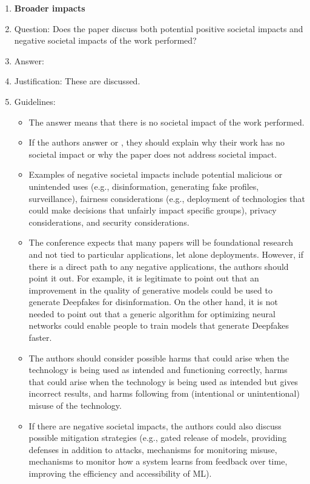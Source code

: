 \documentclass{article}
\theoremstyle{plain}
\theoremstyle{definition}
\theoremstyle{remark}
\begin{document}
\begin{enumerate}
\item {\bf Broader impacts}
    \item[] Question: Does the paper discuss both potential positive societal impacts and negative societal impacts of the work performed?
    \item[] Answer: \answerYes{} %
    \item[] Justification: These are discussed.
    \item[] Guidelines:
    \begin{itemize}
        \item The answer \answerNA{} means that there is no societal impact of the work performed.
        \item If the authors answer \answerNA{} or \answerNo, they should explain why their work has no societal impact or why the paper does not address societal impact.
        \item Examples of negative societal impacts include potential malicious or unintended uses (e.g., disinformation, generating fake profiles, surveillance), fairness considerations (e.g., deployment of technologies that could make decisions that unfairly impact specific groups), privacy considerations, and security considerations.
        \item The conference expects that many papers will be foundational research and not tied to particular applications, let alone deployments. However, if there is a direct path to any negative applications, the authors should point it out. For example, it is legitimate to point out that an improvement in the quality of generative models could be used to generate Deepfakes for disinformation. On the other hand, it is not needed to point out that a generic algorithm for optimizing neural networks could enable people to train models that generate Deepfakes faster.
        \item The authors should consider possible harms that could arise when the technology is being used as intended and functioning correctly, harms that could arise when the technology is being used as intended but gives incorrect results, and harms following from (intentional or unintentional) misuse of the technology.
        \item If there are negative societal impacts, the authors could also discuss possible mitigation strategies (e.g., gated release of models, providing defenses in addition to attacks, mechanisms for monitoring misuse, mechanisms to monitor how a system learns from feedback over time, improving the efficiency and accessibility of ML).
    \end{itemize}
    

\end{enumerate}
\end{document}
